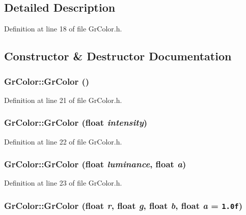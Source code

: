 \subsection{Detailed Description}


Definition at line 18 of file GrColor.h.

\subsection{Constructor \& Destructor Documentation}
\hypertarget{class_gr_color_17afe5cf44819fde9b9303d6749c229e}{
\subsubsection[{GrColor}]{\setlength{\rightskip}{0pt plus 5cm}GrColor::GrColor ()}}
\label{class_gr_color_17afe5cf44819fde9b9303d6749c229e}




Definition at line 21 of file GrColor.h.\hypertarget{class_gr_color_0dc264cb95a190125215e2e33ff673a1}{
\subsubsection[{GrColor}]{\setlength{\rightskip}{0pt plus 5cm}GrColor::GrColor (float {\em intensity})}}
\label{class_gr_color_0dc264cb95a190125215e2e33ff673a1}




Definition at line 22 of file GrColor.h.\hypertarget{class_gr_color_dcc77a569fe079c5fe1e199c7c08c03e}{
\subsubsection[{GrColor}]{\setlength{\rightskip}{0pt plus 5cm}GrColor::GrColor (float {\em luminance}, \/  float {\em a})}}
\label{class_gr_color_dcc77a569fe079c5fe1e199c7c08c03e}




Definition at line 23 of file GrColor.h.\hypertarget{class_gr_color_14158e777e2018dc6df18ea8711facbd}{
\subsubsection[{GrColor}]{\setlength{\rightskip}{0pt plus 5cm}GrColor::GrColor (float {\em r}, \/  float {\em g}, \/  float {\em b}, \/  float {\em a} = {\tt 1.0f})}}
\label{class_gr_color_14158e777e2018dc6df18ea8711facbd}




